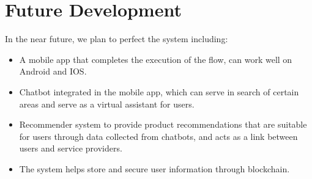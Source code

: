 \section{Future Development}

In the near future, we plan to perfect the system including:
\begin{itemize}
\item A mobile app that completes the execution of the flow, can work well on Android and IOS.
\item Chatbot integrated in the mobile app, which can serve in search of certain areas and serve as a virtual assistant for users.
\item Recommender system to provide product recommendations that are suitable for users through data collected from chatbots, and acts as a link between users and service providers.
\item The system helps store and secure user information through blockchain.
\end{itemize}